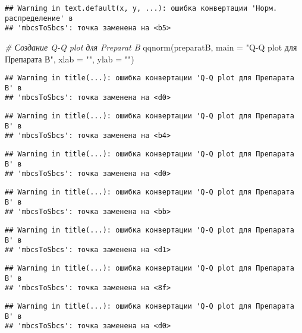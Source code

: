 \documentclass[
]{article}
\newenvironment{Shaded}{\begin{snugshade}}{\end{snugshade}}
\newcommand{\AttributeTok}[1]{\textcolor[rgb]{0.77,0.63,0.00}{#1}}
\newcommand{\CommentTok}[1]{\textcolor[rgb]{0.56,0.35,0.01}{\textit{#1}}}
\newcommand{\FunctionTok}[1]{\textcolor[rgb]{0.00,0.00,0.00}{#1}}
\newcommand{\NormalTok}[1]{#1}
\newcommand{\StringTok}[1]{\textcolor[rgb]{0.31,0.60,0.02}{#1}}
\begin{document}
\begin{verbatim}
## Warning in text.default(x, y, ...): ошибка конвертации 'Норм. распределение' в
## 'mbcsToSbcs': точка заменена на <b5>
\end{verbatim}

\begin{Shaded}
\begin{Highlighting}[]
\CommentTok{\# Создание Q{-}Q plot для Preparat B}
\FunctionTok{qqnorm}\NormalTok{(preparatB, }\AttributeTok{main =} \StringTok{"Q{-}Q plot для Препарата В"}\NormalTok{, }\AttributeTok{xlab =} \StringTok{""}\NormalTok{, }\AttributeTok{ylab =} \StringTok{""}\NormalTok{)}
\end{Highlighting}
\end{Shaded}

\begin{verbatim}
## Warning in title(...): ошибка конвертации 'Q-Q plot для Препарата В' в
## 'mbcsToSbcs': точка заменена на <d0>
\end{verbatim}

\begin{verbatim}
## Warning in title(...): ошибка конвертации 'Q-Q plot для Препарата В' в
## 'mbcsToSbcs': точка заменена на <b4>
\end{verbatim}

\begin{verbatim}
## Warning in title(...): ошибка конвертации 'Q-Q plot для Препарата В' в
## 'mbcsToSbcs': точка заменена на <d0>
\end{verbatim}

\begin{verbatim}
## Warning in title(...): ошибка конвертации 'Q-Q plot для Препарата В' в
## 'mbcsToSbcs': точка заменена на <bb>
\end{verbatim}

\begin{verbatim}
## Warning in title(...): ошибка конвертации 'Q-Q plot для Препарата В' в
## 'mbcsToSbcs': точка заменена на <d1>
\end{verbatim}

\begin{verbatim}
## Warning in title(...): ошибка конвертации 'Q-Q plot для Препарата В' в
## 'mbcsToSbcs': точка заменена на <8f>
\end{verbatim}

\begin{verbatim}
## Warning in title(...): ошибка конвертации 'Q-Q plot для Препарата В' в
## 'mbcsToSbcs': точка заменена на <d0>
\end{verbatim}
\end{document}
